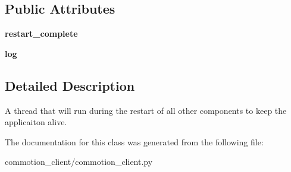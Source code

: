 \subsection*{Public Attributes}
\begin{DoxyCompactItemize}
\item 
\hypertarget{classcommotion__client_1_1commotion__client_1_1HoldStateDuringRestart_ad49b6b600ca627a0498a372f15887859}{{\bfseries restart\-\_\-complete}}\label{classcommotion__client_1_1commotion__client_1_1HoldStateDuringRestart_ad49b6b600ca627a0498a372f15887859}

\item 
\hypertarget{classcommotion__client_1_1commotion__client_1_1HoldStateDuringRestart_a999d8455148ca332ec899dfe79585423}{{\bfseries log}}\label{classcommotion__client_1_1commotion__client_1_1HoldStateDuringRestart_a999d8455148ca332ec899dfe79585423}

\end{DoxyCompactItemize}


\subsection{Detailed Description}
\begin{DoxyVerb}A thread that will run during the restart of all other components to keep the applicaiton alive.
\end{DoxyVerb}
 

The documentation for this class was generated from the following file\-:\begin{DoxyCompactItemize}
\item 
commotion\-\_\-client/commotion\-\_\-client.\-py\end{DoxyCompactItemize}
